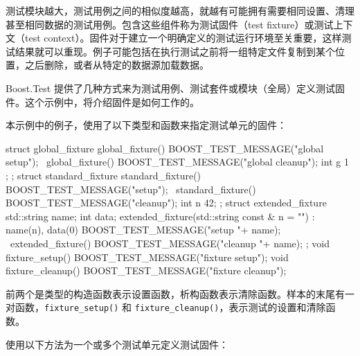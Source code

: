 
测试模块越大，测试用例之间的相似度越高，就越有可能拥有需要相同设置、清理甚至相同数据的测试用例。包含这些组件称为测试固件（test fixture）或测试上下文（test context）。固件对于建立一个明确定义的测试运行环境至关重要，这样测试结果就可以重现。例子可能包括在执行测试之前将一组特定文件复制到某个位置，之后删除，或者从特定的数据源加载数据。

Boost.Test 提供了几种方式来为测试用例、测试套件或模块（全局）定义测试固件。这个示例中，将介绍固件是如何工作的。


本示例中的例子，使用了以下类型和函数来指定测试单元的固件：

\begin{cpp}
struct global_fixture
{
    global_fixture()  { BOOST_TEST_MESSAGE("global setup"); }
    ~global_fixture() { BOOST_TEST_MESSAGE("global cleanup"); }
    int g{ 1 };
};
struct standard_fixture
{
    standard_fixture()  {BOOST_TEST_MESSAGE("setup");}
    ~standard_fixture() {BOOST_TEST_MESSAGE("cleanup");}
    int n {42};
};
struct extended_fixture
{
    std::string name;
    int         data;
    extended_fixture(std::string const & n = "") : name(n), data(0)
    {
        BOOST_TEST_MESSAGE("setup "+ name);
    }
    ~extended_fixture()
    {
        BOOST_TEST_MESSAGE("cleanup "+ name);
    }
};
void fixture_setup()
{
    BOOST_TEST_MESSAGE("fixture setup");
}
void fixture_cleanup()
{
    BOOST_TEST_MESSAGE("fixture cleanup");
}
\end{cpp}

前两个是类型的构造函数表示设置函数，析构函数表示清除函数。样本的末尾有一对函数，\verb|fixture_setup()| 和 \verb|fixture_cleanup()|，表示测试的设置和清除函数。


使用以下方法为一个或多个测试单元定义测试固件：

